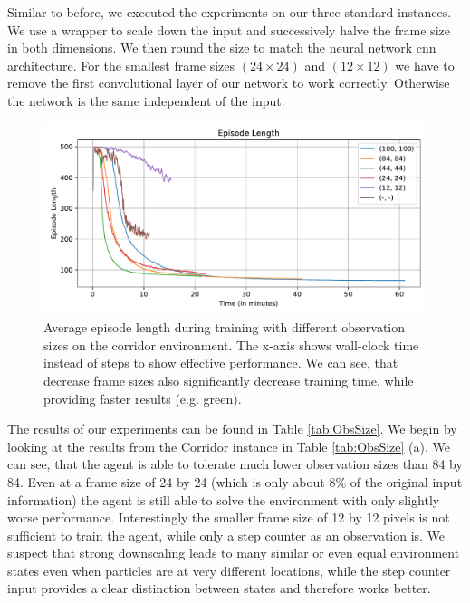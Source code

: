 Similar to before, we executed the experiments on our three standard instances. We use a wrapper to scale down the input and successively halve the frame size in both dimensions. We then round the size to match the neural network cnn architecture. For the smallest frame sizes $(24 \times 24)$ and $(12 \times 12)$ we have to remove the first convolutional layer of our network to work correctly. Otherwise the network is the same independent of the input.

\begin{figure}[htp]
    \begin{center}
        \includegraphics[clip, width=0.95\columnwidth]{figures/evaluation/observations/maze0318_ep_len_time.pdf}
    \end{center}
    \caption[Episode Length on the Corridor Environment using Different Observation Sizes]{Average episode length during training with different observation sizes on the corridor environment. The x-axis shows wall-clock time instead of steps to show effective performance. We can see, that decrease frame sizes also significantly decrease training time, while providing faster results (e.g. green).} \label{fig:ObsSize/Maze0318/EpLen}
\end{figure}


The results of our experiments can be found in Table \ref{tab:ObsSize}. We begin by looking at the results from the Corridor instance in Table \ref{tab:ObsSize} (a). We can see, that the agent is able to tolerate much lower observation sizes than 84 by 84. Even at a frame size of 24 by 24 (which is only about 8\% of the original input information) the agent is still able to solve the environment with only slightly worse performance. Interestingly the smaller frame size of 12 by 12 pixels is not sufficient to train the agent, while only a step counter as an observation is. We suspect that strong downscaling leads to many similar or even equal environment states even when particles are at very different locations, while the step counter input provides a clear distinction between states and therefore works better.


